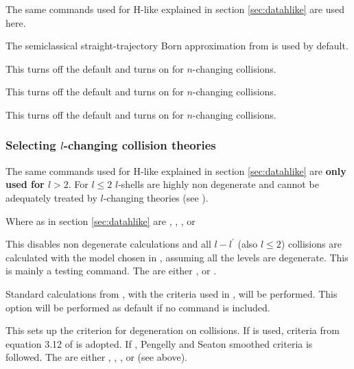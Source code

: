 The same commands used for H-like explained in section \ref{sec:datahlike} are 
used here.

 The semiclassical 
straight-trajectory Born approximation from \citet{Lebedevandbeigman1998} is 
used by default. 

 This turns off the default 
\citet{Lebedevandbeigman1998} and turns on \cite{Vriens1980} for $n$-changing 
collisions. 

 This turns off the default
\citet{Lebedevandbeigman1998} and turns on \cite{Fujimoto1978} for $n$-changing
collisions.

 This turns off the default
\citet{Lebedevandbeigman1998} and turns on \cite{VanRegemorter1962} for $n$-changing
collisions.

\subsubsection{Selecting $l$-changing collision theories}

The same commands used for H-like explained in section \ref{sec:datahlike} are {\bf only used for $l>2$}. 
For $l\leq 2$ $l$-shells are highly non degenerate and cannot be adequately treated by $l$-changing theories 
(see \citet{Guzman.II.2017}). 

 Where as in section \ref{sec:datahlike} 
 are  , , 
 ,  or 

  This disables non degenerate calculations 
and all $l-l^\prime$ (also $l\leq2$) collisions are calculated with the model chosen in , 
assuming all the levels are degenerate. This is mainly a testing command. 
The  are either ,  or .

 Standard calculations from \citep{Badnell2021}, with the criteria used in \citet{Guzman.II.2017}, 
 will be performed. This option will be performed as default if no command is included.
 
This sets up the criterion for degeneration on collisions. If  is used, 
criteria from equation 3.12 of \citet{1972MNRAS.157..211B} is adopted. 
If , Pengelly and Seaton \cite{PengellySeaton1964} smoothed 
criteria is followed. The  are either , 
, , or  (see above).

